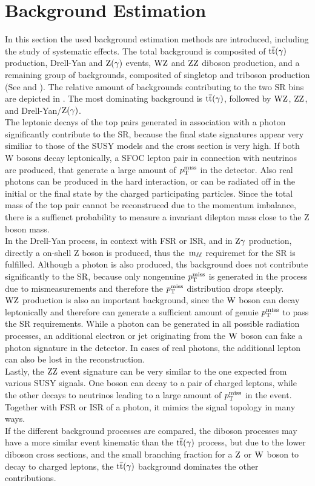 \section{Background Estimation}\label{sec:BKG}
In this section the used background estimation methods are introduced, including the study of systematic effects. The total background is composited of ${\mathrm{t}\overline{\mathrm{t}}}(\gamma)$ production, Drell-Yan and $\mathrm{Z}(\gamma)$ events, $\mathrm{W}\mathrm{Z}$ and $\mathrm{Z}\mathrm{Z}$ diboson production, and a remaining group of backgrounds, composited of \eg singletop and triboson production (See  and ). The relative amount of backgrounds contributing to the two SR bins are depicted in . The most dominating background is ${\mathrm{t}\overline{\mathrm{t}}}(\gamma)$, followed by $\mathrm{W}\mathrm{Z}$, $\mathrm{Z}\mathrm{Z}$, and Drell-Yan/$\mathrm{Z}(\gamma)$.\\
The leptonic decays of the top pairs generated in association with a photon significantly contribute to the SR, because the final state signatures appear very similiar to those of the SUSY models and the cross section is very high. If both W bosons decay leptonically, a SFOC lepton pair in connection with neutrinos are produced, that generate a large amount of $p_{\mathrm{T}}^\text{miss}$ in the detector. Also real photons can be produced in the hard interaction, or can be radiated off in the initial or the final state by the charged participating particles. Since the total mass of the top pair cannot be reconstruced due to the momentum imbalance, there is a suffienct probability to measure a invariant dilepton mass close to the Z boson mass.\\
In the Drell-Yan process, in context with FSR or ISR, and in $\mathrm{Z}\gamma$ production, directly a on-shell Z boson is produced, thus the $\,\text{m}_{\ell\ell}$ requiremet for the SR is fulfilled. Although a photon is also produced, ths background does not contribute significantly to the SR, because only nongenuine $p_{\mathrm{T}}^\text{miss}$ is generated in the process due to mismeasurements and therefore the $p_{\mathrm{T}}^\text{miss}$ distribution drops steeply.\\
$\mathrm{W}\mathrm{Z}$ production is also an important background, since the $\mathrm{W}$ boson can decay leptonically and therefore can generate a sufficient amount of genuie $p_{\mathrm{T}}^\text{miss}$ to pass the SR requirements. While a photon can be generated in all possible radiation processes, an additional electron or jet originating from the $\mathrm{W}$ boson can fake a photon signature in the detector. In cases of real photons, the additional lepton can also be lost in the reconstruction.\\
Lastly, the $\mathrm{Z}\mathrm{Z}$ event signature can be very similar to the one expected from various SUSY signals. One boson can decay to a pair of charged leptons, while the other decays to neutrinos leading to a large amount of $p_{\mathrm{T}}^\text{miss}$ in the event. Together with FSR or ISR of a photon, it mimics the signal topology in many ways.\\
If the different background processes are compared, the diboson processes may have a more similar event kinematic than the ${\mathrm{t}\overline{\mathrm{t}}}(\gamma)$ process, but due to the lower diboson cross sections, and the small branching fraction for a $\mathrm{Z}$ or $\mathrm{W}$ boson to decay to charged leptons, the ${\mathrm{t}\overline{\mathrm{t}}}(\gamma)$ background dominates the other contributions.\\

